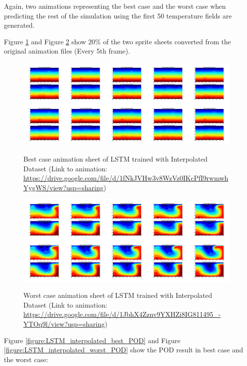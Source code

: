 Again, two animations representing the best case and the worst case when predicting the rest of the simulation using the first 50 temperature fields are generated.

Figure \ref{figure:LSTM_interpolated_best_gif} and Figure \ref{figure:LSTM_interpolated_worst_gif} show 20\% of the two sprite sheets converted from the original animation files (Every 5th frame).

\begin{figure}[H]
    \centering
    \caption{Best case animation sheet of LSTM trained with Interpolated Dataset (Link to animation: \url{https://drive.google.com/file/d/1fNkJVHw3v8WzVz0IKcPfI9rwmwhYygWS/view?usp=sharing})}
    \includegraphics[scale=0.10]{figures/mantle_convection_images/larger_dataset_interpolated/LSTM_Best_GIF_sheet.png}
     \label{figure:LSTM_interpolated_best_gif}
\end{figure}

\begin{figure}[H]
    \centering
    \caption{Worst case animation sheet of LSTM trained with Interpolated Dataset (Link to animation: 
    \url{https://drive.google.com/file/d/1JbhX4Zznv9YXHZi8IG811495_-YTOq9l/view?usp=sharing})}
    \includegraphics[scale=0.10]{figures/mantle_convection_images/larger_dataset_interpolated/LSTM_Worst_GIF_sheet.png}
    \label{figure:LSTM_interpolated_worst_gif}
\end{figure}

Figure \ref{figure:LSTM_interpolated_best_POD} and Figure \ref{figure:LSTM_interpolated_worst_POD} show the POD result in best case and the worst case:

